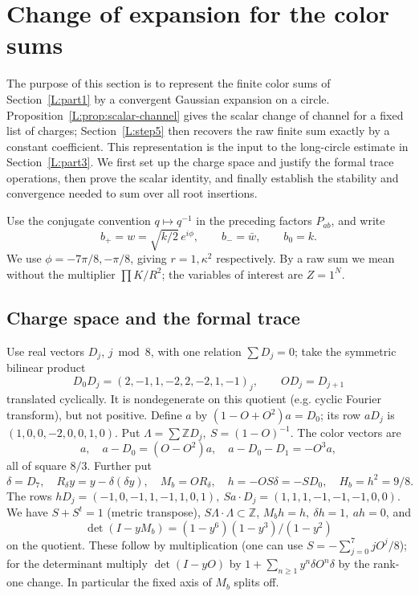 \section{Change of expansion for the color sums}\label{L:part2}

The purpose of this section is to represent the finite color sums of
Section~\ref{L:part1} by a convergent Gaussian expansion on a circle.
Proposition~\ref{L:prop:scalar-channel} gives the scalar change of channel
for a fixed list of charges; Section~\ref{L:step5} then recovers the raw
finite sum exactly by a constant coefficient. This representation is the
input to the long-circle estimate in Section~\ref{L:part3}. We first set up
the charge space and justify the formal trace operations, then prove the
scalar identity, and finally establish the stability and convergence
needed to sum over all root insertions.

Use the conjugate convention \(q\mapsto q^{-1}\) in the preceding factors \(P_{ab}\), and write
\[
 b_+=w=\sqrt{k/2}\,e^{i\phi},\qquad b_-=\bar w,\qquad b_0=k .
\]
We use \(\phi=-7\pi/8,-\pi/8\), giving \(r=1,\kappa^2\) respectively. By a raw sum we mean without the multiplier \(\prod K/R^2\); the variables of interest are \(Z=1^N\).

\subsection{Charge space and the formal trace}

Use real vectors \(D_j\), \(j\bmod8\), with one relation \(\sum D_j=0\); take the symmetric bilinear product
\[
 D_0 D_j=(2,-1,1,-2,2,-2,1,-1)_j,\qquad O D_j=D_{j+1}
\]
translated cyclically. It is nondegenerate on this quotient (e.g. cyclic Fourier transform), but not positive. Define \(a\) by \((1-O+O^2)a=D_0\); its row \(aD_j\) is \((1,0,0,-2,0,0,1,0)\). Put \(\Lambda=\sum\mathbb Z D_j,\ S=(1-O)^{-1}\). The color vectors are
\[
 a,\quad a-D_0=(O-O^2)a,\quad a-D_0-D_1=-O^3a ,
\]
all of square \(8/3\). Further put
\[
 \delta=D_7,\quad R_\delta y=y-\delta(\delta y),\quad M_b=O R_\delta,\quad h=-OS\delta=-S D_0,\quad H_b=h^2=9/8 .
\]
The rows \(hD_j=(-1,0,-1,1,-1,1,0,1),\ Sa\cdot D_j=(1,1,1,-1,-1,-1,0,0)\). We have \(S+S^t=1\) (metric transpose), \(S\Lambda\cdot\Lambda\subset\mathbb Z\), \(M_b h=h,\ \delta h=1,\ ah=0\), and
\[
 \det(I-yM_b)=(1-y^6)(1-y^3)/(1-y^2)
\]
on the quotient. These follow by multiplication (one can use \(S=-\sum_{j=0}^7 j O^j/8\)); for the determinant multiply \(\det(I-yO)\) by \(1+\sum_{n\ge1}y^n\delta O^n\delta\) by the rank-one change. In particular the fixed axis of \(M_b\) splits off.

